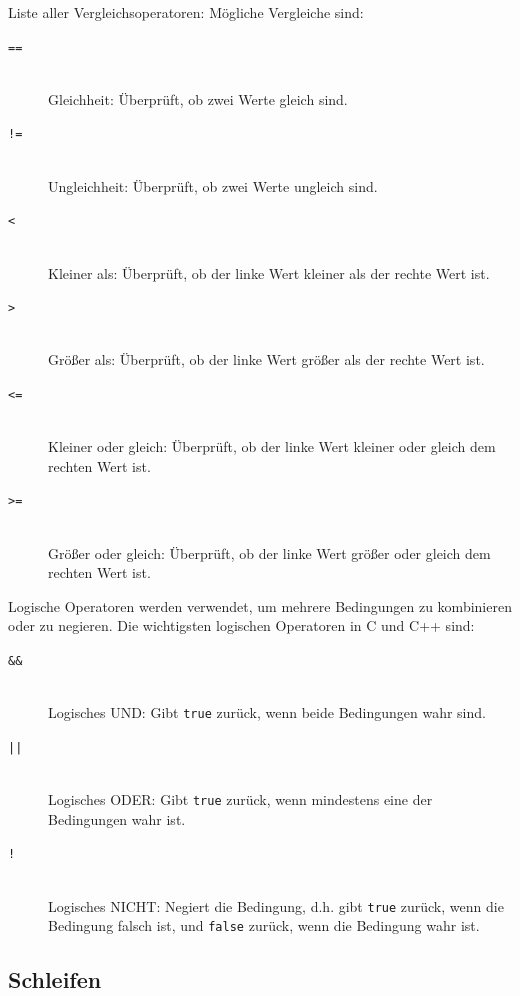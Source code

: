 Liste aller Vergleichsoperatoren:
Mögliche Vergleiche sind:
\begin{description}
    \item[\texttt{==}]\hfill\\
        Gleichheit: Überprüft, ob zwei Werte gleich sind.
    \item[\texttt{!=}]\hfill\\
        Ungleichheit: Überprüft, ob zwei Werte ungleich sind.
    \item[\texttt{<}]\hfill\\
        Kleiner als: Überprüft, ob der linke Wert kleiner als der rechte Wert ist.
    \item[\texttt{>}]\hfill\\
        Größer als: Überprüft, ob der linke Wert größer als der rechte Wert ist.
    \item[\texttt{<=}]\hfill\\
        Kleiner oder gleich: Überprüft, ob der linke Wert kleiner oder gleich dem rechten Wert ist.
    \item[\texttt{>=}]\hfill\\
        Größer oder gleich: Überprüft, ob der linke Wert größer oder gleich dem rechten Wert ist.
\end{description}

Logische Operatoren werden verwendet, um mehrere Bedingungen zu kombinieren oder zu negieren. Die wichtigsten logischen Operatoren in C und C++ sind:
\begin{description}
    \item[\texttt{\&\&}]\hfill\\
        Logisches UND: Gibt \texttt{true} zurück, wenn beide Bedingungen wahr sind.
    \item[\texttt{||}]\hfill\\
        Logisches ODER: Gibt \texttt{true} zurück, wenn mindestens eine der Bedingungen wahr ist.
    \item[\texttt{!}]\hfill\\
        Logisches NICHT: Negiert die Bedingung, d.h. gibt \texttt{true} zurück, wenn die Bedingung falsch ist, und \texttt{false} zurück, wenn die Bedingung wahr ist.
\end{description}   

\subsection{Schleifen}
\label{sec:referenz:c:schleifen}


